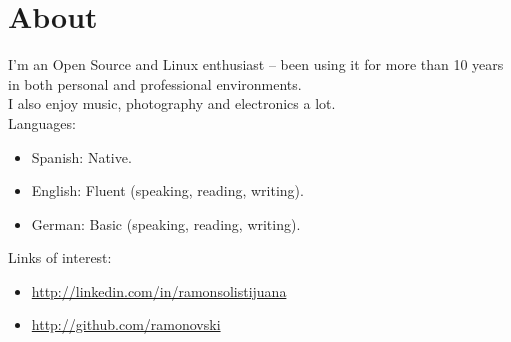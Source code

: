 \documentclass[letterpaper, 11pt]{article}
\begin{document}
	\section*{\huge{About}}
	\noindent\makebox[\linewidth]{\rule{\textwidth}{0.5pt}} 
	I'm an Open Source and Linux enthusiast -- been using it for more than 10 years in both personal and professional environments.\\[5mm]
	I also enjoy music, photography and electronics a lot.\\[5mm]
	Languages:
	\begin{itemize} \itemsep1pt \parskip0pt 
		\item Spanish: Native.
		\item English: Fluent (speaking, reading, writing).
		\item German: Basic (speaking, reading, writing).
	\end{itemize}
	Links of interest:
	\begin{itemize} \itemsep1pt \parskip0pt 
		\item\href{http://linkedin.com/in/ramonsolistijuana}{http://linkedin.com/in/ramonsolistijuana}
		\item\href{http://github.com/ramonovski}{http://github.com/ramonovski}
	\end{itemize}
\end{document}
